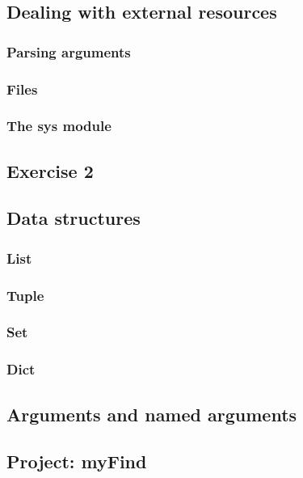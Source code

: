 
\subsection{Dealing with external resources}
\subsubsection{Parsing arguments}
\subsubsection{Files}
\subsubsection{The sys module}

\subsection{Exercise 2}

\subsection{Data structures}
\subsubsection{List}
\subsubsection{Tuple}
\subsubsection{Set}
\subsubsection{Dict}

\subsection{Arguments and named arguments}

\subsection{Project: myFind}
